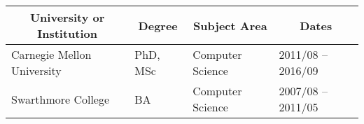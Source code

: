 \documentclass[10pt]{article}
\begin{document}
\section{}
\noindent\vspace{-2em}
\begin{table}[h!]
  \begin{tabular}{ p{} p{} p{} p{} }
    \toprule
    \multicolumn{1}{c}{\bf University or Institution} & \multicolumn{1}{c}{\bf Degree} & \multicolumn{1}{c}{\bf Subject Area}            & \multicolumn{1}{c}{\bf Dates} \\
    \midrule
    Carnegie Mellon University & PhD, MSc & Computer Science & 2011/08 -- 2016/09 \\
    Swarthmore College         & BA       & Computer Science & 2007/08 -- 2011/05 \\
    \bottomrule
  \end{tabular}
\end{table}


\section{}
\end{document}
